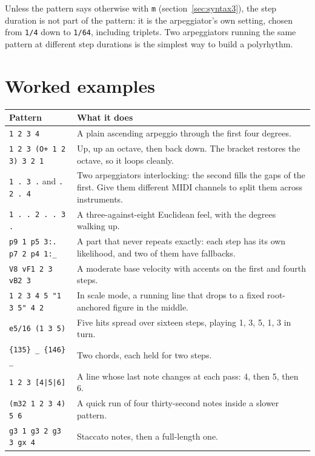 \documentclass[11pt,a4paper]{article}
\newcommand{\pat}[1]{\texttt{#1}}
\begin{document}
Unless the pattern says otherwise with \pat{m} (section~\ref{sec:syntax3}), the
step duration is not part of the pattern: it is the arpeggiator's own setting,
chosen from \pat{1/4} down to \pat{1/64}, including triplets. Two
arpeggiators running the same pattern at different step durations is the
simplest way to build a polyrhythm.

\section{Worked examples}

\begin{center}
\begin{longtable}{@{}p{62mm}p{80mm}@{}}
\toprule
\textbf{Pattern} & \textbf{What it does}\\
\midrule
\endhead
\pat{1 2 3 4}
  & A plain ascending arpeggio through the first four degrees.\\[1mm]
\pat{1 2 3 (O+ 1 2 3) 3 2 1}
  & Up, up an octave, then back down. The bracket restores the octave, so it
    loops cleanly.\\[1mm]
\pat{1 . 3 .} \quad and \quad \pat{. 2 . 4}
  & Two arpeggiators interlocking: the second fills the gaps of the first. Give
    them different MIDI channels to split them across instruments.\\[1mm]
\pat{1 . . 2 . . 3 .}
  & A three-against-eight Euclidean feel, with the degrees walking up.\\[1mm]
\pat{p9 1 p5 3:. p7 2 p4 1:\_}
  & A part that never repeats exactly: each step has its own likelihood, and
    two of them have fallbacks.\\[1mm]
\pat{V8 vF1 2 3 vB2 3}
  & A moderate base velocity with accents on the first and fourth steps.\\[1mm]
\pat{1 2 3 4 5 "1 3 5" 4 2}
  & In scale mode, a running line that drops to a fixed root-anchored figure in
    the middle.\\[1mm]
\pat{e5/16 (1 3 5)}
  & Five hits spread over sixteen steps, playing 1, 3, 5, 1, 3 in turn.\\[1mm]
\pat{\{135\} \_ \{146\} \_}
  & Two chords, each held for two steps.\\[1mm]
\pat{1 2 3 [4|5|6]}
  & A line whose last note changes at each pass: 4, then 5, then 6.\\[1mm]
\pat{(m32 1 2 3 4) 5 6}
  & A quick run of four thirty-second notes inside a slower pattern.\\[1mm]
\pat{g3 1 g3 2 g3 3 gx 4}
  & Staccato notes, then a full-length one.\\
\bottomrule
\end{longtable}
\end{center}
\end{document}
